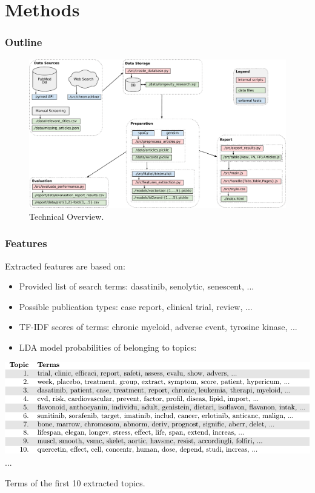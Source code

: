 \documentclass[10pt, xcolor={dvipsnames}]{beamer}
\begin{document}
\section{Methods}
\begin{frame}
\frametitle{Outline}
\begin{figure}[H]
\centering
\includegraphics[width=1\textwidth]{../report/diagrams/technical-overview/technical-overview-crop.pdf}
\caption{Technical Overview.}
\end{figure}
\end{frame}

\begin{frame}
\frametitle{Features}
Extracted features are based on:
\begin{itemize}
\item Provided list of search terms: dasatinib, senolytic, senescent, ...
\item Possible publication types: case report, clinical trial, review, ...
\item TF-IDF scores of terms: chronic myeloid, adverse event, tyrosine kinase, ...
\item LDA model probabilities of belonging to topics:
\end{itemize}
\vspace{1mm}
\centering
\begin{table}
\includegraphics[width=1\textwidth]{../report/tables/topics/topics-crop.pdf}
...
\caption{Terms of the first 10 extracted topics.}
\end{table}
\end{frame}
\end{document}

